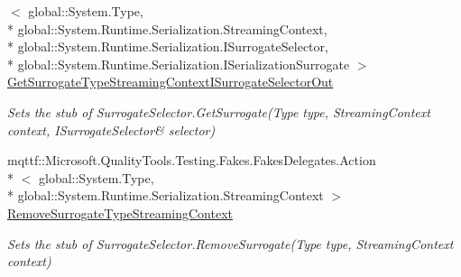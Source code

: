 \begin{DoxyCompactItemize}
$<$ global\-::\-System.\-Type, \\*
global\-::\-System.\-Runtime.\-Serialization.\-Streaming\-Context, \\*
global\-::\-System.\-Runtime.\-Serialization.\-I\-Surrogate\-Selector, \\*
global\-::\-System.\-Runtime.\-Serialization.\-I\-Serialization\-Surrogate $>$ \hyperlink{class_system_1_1_runtime_1_1_serialization_1_1_fakes_1_1_stub_surrogate_selector_a5e2d4bfa9b098e52921c4b8dc793e602}{Get\-Surrogate\-Type\-Streaming\-Context\-I\-Surrogate\-Selector\-Out}
\begin{DoxyCompactList}\small\item\em Sets the stub of Surrogate\-Selector.\-Get\-Surrogate(Type type, Streaming\-Context context, I\-Surrogate\-Selector\& selector)\end{DoxyCompactList}\item 
mqttf\-::\-Microsoft.\-Quality\-Tools.\-Testing.\-Fakes.\-Fakes\-Delegates.\-Action\\*
$<$ global\-::\-System.\-Type, \\*
global\-::\-System.\-Runtime.\-Serialization.\-Streaming\-Context $>$ \hyperlink{class_system_1_1_runtime_1_1_serialization_1_1_fakes_1_1_stub_surrogate_selector_a1855949aa0eae9609bca41a0e497da83}{Remove\-Surrogate\-Type\-Streaming\-Context}
\begin{DoxyCompactList}\small\item\em Sets the stub of Surrogate\-Selector.\-Remove\-Surrogate(\-Type type, Streaming\-Context context)\end{DoxyCompactList}\end{DoxyCompactItemize}
